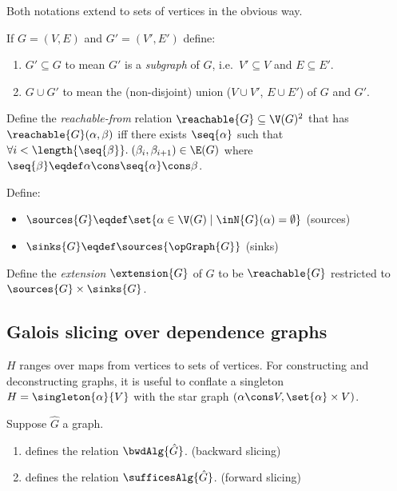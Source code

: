 \noindent Both notations extend to sets of vertices in the obvious way.

\begin{definition}
   If $G = (V, E)$ and $G' = (V', E')$ define:
   \begin{enumerate}
      \item $G' \subseteq G$ to mean $G'$ is a \emph{subgraph} of $G$, i.e.~$V' \subseteq V$ and $E \subseteq E'$.
      \item $G \cup G'$ to mean the (non-disjoint) union ($V \cup V'$, $E \cup E'$) of $G$ and $G'$.
   \end{enumerate}
\end{definition}

\begin{definition}[Reachable]
   Define the \emph{reachable-from} relation $\reachable{G} \subseteq \V(G)^2$ that has $\reachable{G}(\alpha,
   \beta)$ iff there exists $\seq{\alpha}$ such that $\forall i < \length{\seq{\beta}}.\;(\beta_i,\beta_{i+1})
   \in \E(G)$ where $\seq{\beta} \eqdef \alpha \cons \seq{\alpha} \cons \beta$.
\end{definition}

\begin{definition}
   Define:
   \begin{itemize}
      \item $\sources{G} \eqdef \set{\alpha \in \V(G) \mid \inN{G}(\alpha) = \emptyset}$ \hfill (sources)
      \item $\sinks{G} \eqdef \sources{\opGraph{G}}$ \hfill (sinks)
   \end{itemize}
\end{definition}

\begin{definition}[Extension]
   Define the \emph{extension} $\extension{G}$ of $G$ to be $\reachable{G}$ restricted to $\sources{G} \times \sinks{G}$.
\end{definition}

\subsection{Galois slicing over dependence graphs}

$H$ ranges over maps from vertices to sets of vertices. For constructing and deconstructing graphs, it is
useful to conflate a singleton $H = \singleton{\alpha}{V}$ with the star graph $(\alpha \cons V, \set{\alpha}
\times V)$.

\begin{definition}
   \item Suppose $\hat{G}$ a graph.
   \begin{enumerate}
      \item {} defines the relation $\bwdAlg{\hat{G}}$. \hfill (backward slicing)
      \item {} defines the relation $\sufficesAlg{\hat{G}}$. \hfill (forward slicing)
   \end{enumerate}
\end{definition}

